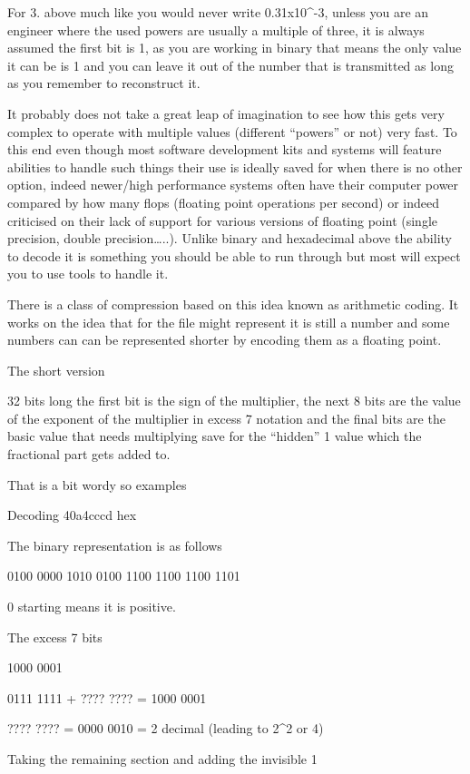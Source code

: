 \documentclass[
]{book}
\begin{document}
For 3. above much like you would never write 0.31x10\^{}-3, unless you are an engineer where the used powers are usually a multiple of three, it is always assumed the first bit is 1, as you are working in binary that means the only value it can be is 1 and you can leave it out of the number that is transmitted as long as you remember to reconstruct it.

It probably does not take a great leap of imagination to see how this gets very complex to operate with multiple values (different ``powers'' or not) very fast. To this end even though most software development kits and systems will feature abilities to handle such things their use is ideally saved for when there is no other option, indeed newer/high performance systems often have their computer power compared by how many flops (floating point operations per second) or indeed criticised on their lack of support for various versions of floating point (single precision, double precision\ldots..). Unlike binary and hexadecimal above the ability to decode it is something you should be able to run through but most will expect you to use tools to handle it.

There is a class of compression based on this idea known as arithmetic coding. It works on the idea that for the file might represent it is still a number and some numbers can can be represented shorter by encoding them as a floating point.

The short version

32 bits long the first bit is the sign of the multiplier, the next 8 bits are the value of the exponent of the multiplier in excess 7 notation and the final bits are the basic value that needs multiplying save for the ``hidden'' 1 value which the fractional part gets added to.

That is a bit wordy so examples

Decoding 40a4cccd hex

The binary representation is as follows

0100 0000 1010 0100 1100 1100 1100 1101

0 starting means it is positive.

The excess 7 bits

1000 0001

0111 1111 + ???? ???? = 1000 0001

???? ???? = 0000 0010 = 2 decimal (leading to 2\^{}2 or 4)

Taking the remaining section and adding the invisible 1
\end{document}
